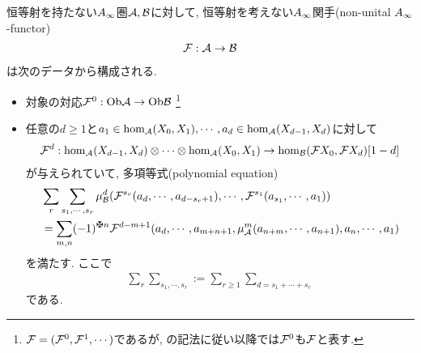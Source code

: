 \documentclass[uplatex, a4paper, 14Q, dvipdfmx]{jsarticle}
\begin{document}
\begin{definition}
  恒等射を持たない$A_{\infty}$圏$\mathcal{A}, \mathcal{B}$に対して, 恒等射を考えない$A_{\infty}$関手(non-unital $A_{\infty}$-functor) 
  \begin{align*}
    \mathcal{F} : \mathcal{A} \to \mathcal{B}
  \end{align*}
  は次のデータから構成される. 
  \begin{itemize}
    \item 対象の対応$\mathcal{F}^0 : \mathrm{Ob}\mathcal{A} \to \mathrm{Ob}\mathcal{B}$
    \footnote{
      $\mathcal{F}=(\mathcal{F}^0,\mathcal{F}^1,\cdots)$であるが, \cite{Sei}の記法に従い以降では$\mathcal{F}^0$も$\mathcal{F}$と表す. 
    }
    \item 任意の$d \geq 1$と$a_1 \in \hom_{\mathcal{A}}(X_0,X_1), \cdots, a_d \in \hom_{\mathcal{A}}(X_{d-1},X_d)$に対して
    \begin{align*}
      \mathcal{F}^d : \hom_{\mathcal{A}}(X_{d-1},X_d) \otimes \cdots \otimes \hom_{\mathcal{A}}(X_0,X_1) \to \hom_{\mathcal{B}}(\mathcal{F} X_0,\mathcal{F} X_d)[1-d]
    \end{align*}
    が与えられていて, 多項等式(polynomial equation)
    \begin{align*}
      &\sum_r \sum_{s_1,\cdots,s_r} \mu^d_\B (\F^{s_r} (a_d,\cdots,a_{d-s_r+1}), \cdots, \F^{s_1}(a_{s_1},\cdots,a_1)) \\ 
      &= \sum_{m,n} (-1)^{\maltese n} \F^{d-m+1} (a_d,\cdots,a_{m+n+1}, \mu^m_\A(a_{n+m},\cdots,a_{n+1}), a_n,\cdots,a_1)
    \end{align*}
    を満たす. 
    ここで
    \begin{align*}
      \sum_r \sum_{s_1,\cdots,s_r} 
      := \sum_{r \geq 1} \sum_{d = s_1 + \cdots + s_r}
    \end{align*}
    である. 
  \end{itemize}
\end{definition}
\end{document}
